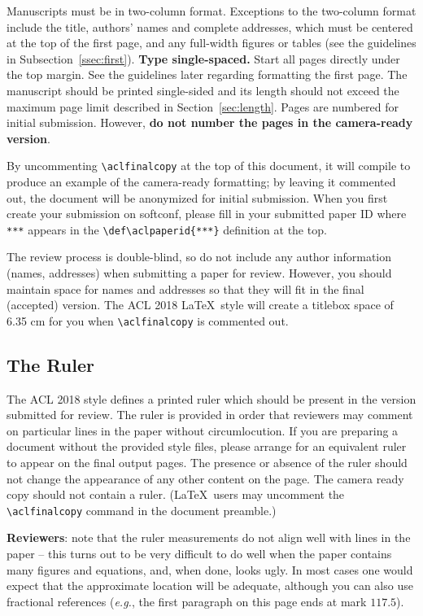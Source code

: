 \documentclass[11pt,a4paper]{article}
\begin{document}
Manuscripts must be in two-column format.  Exceptions to the
two-column format include the title, authors' names and complete
addresses, which must be centered at the top of the first page, and
any full-width figures or tables (see the guidelines in
Subsection~\ref{ssec:first}). \textbf{Type single-spaced.}  Start all
pages directly under the top margin. See the guidelines later
regarding formatting the first page.  The manuscript should be
printed single-sided and its length
should not exceed the maximum page limit described in Section~\ref{sec:length}.
Pages are numbered for  initial submission. However, \textbf{do not number the pages in the camera-ready version}.

By uncommenting {\verb|\aclfinalcopy|} at the top of this
 document, it will compile to produce an example of the camera-ready formatting; by leaving it commented out, the document will be anonymized for initial submission.  When you first create your submission on softconf, please fill in your submitted paper ID where {\verb|***|} appears in the {\verb|\def\aclpaperid{***}|} definition at the top.

The review process is double-blind, so do not include any author information (names, addresses) when submitting a paper for review.
However, you should maintain space for names and addresses so that they will fit in the final (accepted) version.  The ACL 2018 \LaTeX\ style will create a titlebox space of 6.35 cm for you when {\verb|\aclfinalcopy|} is commented out.

\subsection{The Ruler}
The ACL 2018 style defines a printed ruler which should be present in the
version submitted for review.  The ruler is provided in order that
reviewers may comment on particular lines in the paper without
circumlocution.  If you are preparing a document without the provided
style files, please arrange for an equivalent ruler to
appear on the final output pages.  The presence or absence of the ruler
should not change the appearance of any other content on the page.  The
camera ready copy should not contain a ruler. (\LaTeX\ users may uncomment the {\verb|\aclfinalcopy|} command in the document preamble.)

\textbf{Reviewers}: note that the ruler measurements do not align well with
lines in the paper -- this turns out to be very difficult to do well
when the paper contains many figures and equations, and, when done,
looks ugly. In most cases one would expect that the approximate
location will be adequate, although you can also use fractional
references ({\em e.g.}, the first paragraph on this page ends at mark $117.5$).
\end{document}
